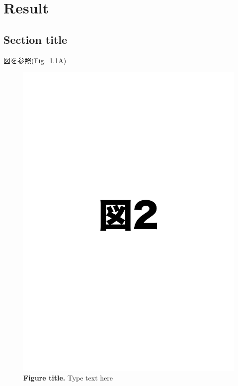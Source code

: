 \chapter{Result}


\section{Section title}
図を参照(Fig.~\ref{fig:Fig2}A)

\begin{figure}[htbp]
    \includegraphics[width=1.0\textwidth]{img/Fig2.pdf}
    \caption[Figure title]{%
        \textbf{Figure title.}%
        \newline
        Type text here
    }\label{fig:Fig2}
\end{figure}

